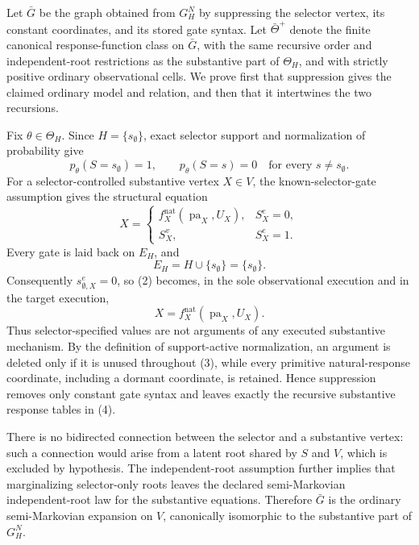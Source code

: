 Let \(\bar G\) be the graph obtained from \(G_H^N\) by suppressing the selector vertex, its constant coordinates, and its stored gate syntax.  Let \(\bar\Theta^{+}\) denote the finite canonical response-function class on \(\bar G\), with the same recursive order and independent-root restrictions as the substantive part of \(\Theta_H\), and with strictly positive ordinary observational cells.  We prove first that suppression gives the claimed ordinary model and relation, and then that it intertwines the two recursions.

Fix \(\theta\in\Theta_H\).  Since \(H=\{s_{\emptyset}\}\), exact selector support and normalization of probability give
\[
 p_\theta(S=s_{\emptyset})=1,
 \qquad
 p_\theta(S=s)=0\quad\text{for every }s\ne s_{\emptyset}.
 \tag{1}
\]
For a selector-controlled substantive vertex \(X\in V\), the known-selector-gate assumption gives the structural equation
\[
 X=
 \begin{cases}
 f_X^{\mathrm{nat}}(\operatorname{pa}_X,U_X),&S_X^e=0,\\
 S_X^v,&S_X^e=1.
 \end{cases}
 \tag{2}
\]
Every gate is laid back on \(E_H\), and
\[
 E_H=H\cup\{s_{\emptyset}\}=\{s_{\emptyset}\}.
 \tag{3}
\]
Consequently \(s_{\emptyset,X}^e=0\), so (2) becomes, in the sole observational execution and in the target execution,
\[
 X=f_X^{\mathrm{nat}}(\operatorname{pa}_X,U_X).
 \tag{4}
\]
Thus selector-specified values are not arguments of any executed substantive mechanism.  By the definition of support-active normalization, an argument is deleted only if it is unused throughout (3), while every primitive natural-response coordinate, including a dormant coordinate, is retained.  Hence suppression removes only constant gate syntax and leaves exactly the recursive substantive response tables in (4).

There is no bidirected connection between the selector and a substantive vertex: such a connection would arise from a latent root shared by \(S\) and \(V\), which is excluded by hypothesis.  The independent-root assumption further implies that marginalizing selector-only roots leaves the declared semi-Markovian independent-root law for the substantive equations.  Therefore \(\bar G\) is the ordinary semi-Markovian expansion on \(V\), canonically isomorphic to the substantive part of \(G_H^N\).

